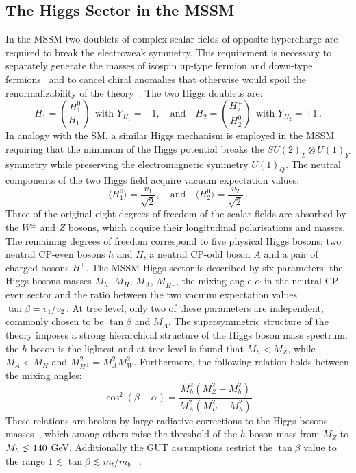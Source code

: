 \subsection{The Higgs Sector in the MSSM }\label{sec:hsector}
In the MSSM two doublets of complex scalar fields of opposite hypercharge are required to break the electroweak symmetry. 
This requirement is necessary to separately generate the masses of isospin up-type fermion and down-type fermions~\cite{Susy2,Higgsm1,Higgsm2}
and to cancel chiral anomalies that otherwise would spoil the renormalizability of the theory~\cite{Higgsm3}. The two Higgs doublets  are:
\begin{equation}
H_1 = \binom{H_1^0}{H_1^-} ~ ~ \text{with } Y_{H_1} = -1, \quad \text{and} \quad H_2 = \binom{H_2^+}{H_2^0} ~ ~ \text{with } Y_{H_2} = +1 \,. 
\end{equation}
In analogy with the SM, a similar Higgs mechanism is employed in the MSSM~\cite{MSSM1,Higgsm4}  requiring that the minimum 
of the Higgs potential breaks the $SU(2)_L \otimes U(1)_Y$ symmetry while preserving the electromagnetic symmetry $U(1)_Q$.
The neutral components of the 
two Higgs field acquire vacuum expectation values:
\begin{equation}
\langle H_1^0 \rangle = \frac{v_1}{\sqrt{2}}, \quad \text{and} \quad  \langle H_2^0 \rangle = \frac{v_2}{\sqrt{2}}\,.
\end{equation}
Three of the original eight degrees of freedom of the scalar fields are absorbed by the $W^{\pm}$ and $Z$ bosons, which acquire
their longitudinal polarisations and masses. The remaining degrees of freedom correspond to five physical Higgs bosons: two neutral CP-even 
bosons $h$ and $H$, 
a neutral CP-odd boson $A$ and a pair of charged bosons $H^{\pm}$. 
The MSSM Higgs sector is described by six parameters: the Higgs bosons masses $M_h$, $M_H$, $M_A$, $M_{H^\pm}$,
the mixing angle $\alpha$ in the neutral CP-even sector  and the ratio between the two vacuum expectation values $\tan \beta = v_1/v_2\,$.
At tree level,  only two of these parameters  are  independent, commonly chosen to be  $\tan \beta$ and $M_A$. 
The supersymmetric structure of the theory imposes a strong hierarchical structure of the Higgs boson mass spectrum:  
the $h$ boson is the lightest  and at tree level is found that  $M_h < M_Z$, while $M_A < M_H$ and $M_{H^\pm}^2 = M_A^2 M_W^2$. Furthermore, the 
following relation holds between the mixing angles:
\begin{equation}\label{eq:mixing}
\cos^2(\beta - \alpha) = \frac{M_h^2 (M_Z^2 - M_h^2)}{M_A^2 (M_H^2 - M_h^2)}
\end{equation}
These relations are broken by large radiative corrections to the Higgs bosons 
masses~\cite{Higgsm5}, which among others raise the threshold of the  $h$ boson mass from  $M_Z$ to $\mh \apprle 140$ GeV.
Additionally the GUT assumptions restrict the $\tan\beta$ value to the range  $1 \apprle \tan \beta \apprle m_t/m_b$ ~\cite{Higgsm6}.


